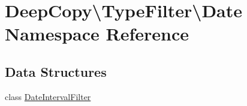 \hypertarget{namespace_deep_copy_1_1_type_filter_1_1_date}{}\section{Deep\+Copy\textbackslash{}Type\+Filter\textbackslash{}Date Namespace Reference}
\label{namespace_deep_copy_1_1_type_filter_1_1_date}
\subsection*{Data Structures}
\begin{DoxyCompactItemize}
\item 
class \mbox{\hyperlink{class_deep_copy_1_1_type_filter_1_1_date_1_1_date_interval_filter}{Date\+Interval\+Filter}}
\end{DoxyCompactItemize}
